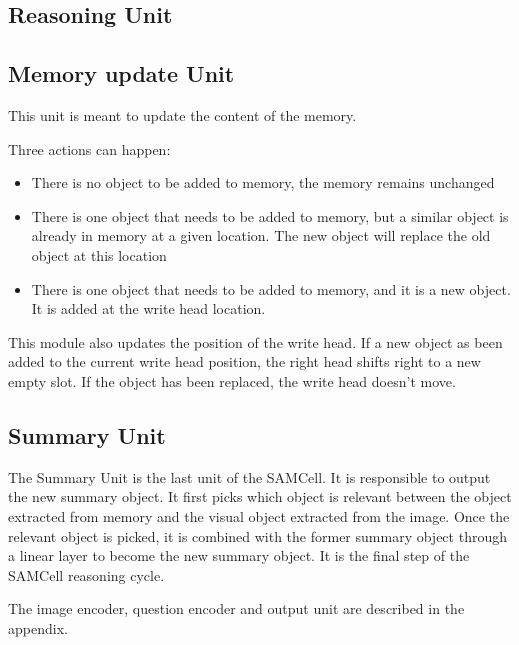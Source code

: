 \subsection{Reasoning Unit}


\subsection{Memory update Unit}

This unit is meant to update the content of the memory. 

Three actions can happen:

\begin{itemize}
	\item There is no object to be added to memory, the memory remains unchanged
	\item There is one object that needs to be added to memory, but a similar object is already in memory at a given location. The new object will replace the old object at this location
	
	\item There is one object that needs to be added to memory, and  it is a new object. It is added at the write head location.
\end{itemize}


This module also updates the position of the write head. If a new object as been added to the current write head position, the right head shifts right to a new empty slot. If the object has been replaced, the write head doesn't move.

\subsection{Summary  Unit}

The  Summary Unit is the last unit of the SAMCell. It is responsible to output the new summary object. It first picks which object is relevant between the object extracted from memory and the visual object extracted from the image. Once the relevant object is picked, it is combined with the former summary object through a linear layer to become the new summary object. It is the final step of the SAMCell reasoning cycle. 

The image encoder, question encoder and output unit are described in the appendix.
